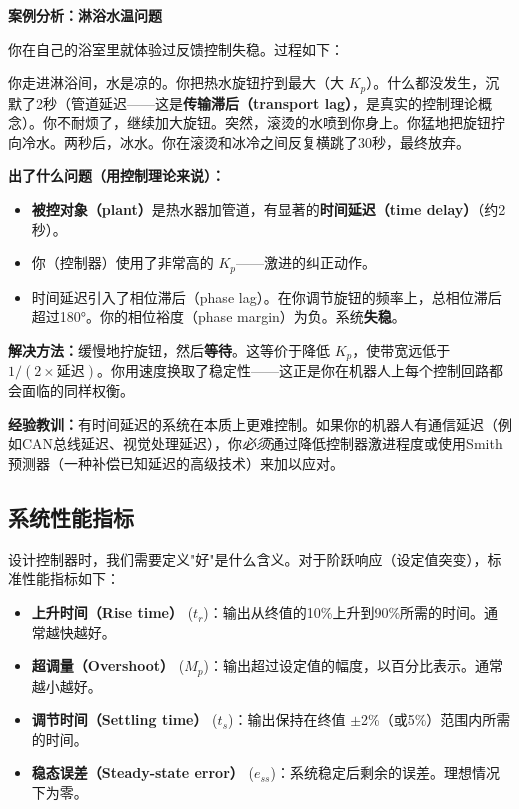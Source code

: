 \vspace{0.5em}
\begin{mdframed}[linewidth=1pt, innertopmargin=10pt, innerbottommargin=10pt]
\textbf{案例分析：淋浴水温问题}

\vspace{0.3em}
你在自己的浴室里就体验过反馈控制失稳。过程如下：

你走进淋浴间，水是凉的。你把热水旋钮拧到最大（大 $K_p$）。什么都没发生，沉默了2秒（管道延迟——这是\textbf{传输滞后（transport lag）}，是真实的控制理论概念）。你不耐烦了，继续加大旋钮。突然，滚烫的水喷到你身上。你猛地把旋钮拧向冷水。两秒后，冰水。你在滚烫和冰冷之间反复横跳了30秒，最终放弃。

\textbf{出了什么问题（用控制理论来说）：}
\begin{itemize}[nosep]
    \item \textbf{被控对象（plant）}是热水器加管道，有显著的\textbf{时间延迟（time delay）}（约2秒）。
    \item 你（控制器）使用了非常高的 $K_p$——激进的纠正动作。
    \item 时间延迟引入了相位滞后（phase lag）。在你调节旋钮的频率上，总相位滞后超过180°。你的相位裕度（phase margin）为负。系统\textbf{失稳}。
\end{itemize}

\textbf{解决方法：}缓慢地拧旋钮，然后\textbf{等待}。这等价于降低 $K_p$，使带宽远低于 $1/(2 \times \text{延迟})$。你用速度换取了稳定性——这正是你在机器人上每个控制回路都会面临的同样权衡。

\textbf{经验教训：}有时间延迟的系统在本质上更难控制。如果你的机器人有通信延迟（例如CAN总线延迟、视觉处理延迟），你\textit{必须}通过降低控制器激进程度或使用Smith预测器（一种补偿已知延迟的高级技术）来加以应对。
\end{mdframed}

\subsection{系统性能指标}

设计控制器时，我们需要定义"好"是什么含义。对于阶跃响应（设定值突变），标准性能指标如下：

\begin{itemize}
    \item \textbf{上升时间（Rise time）} ($t_r$)：输出从终值的10\%上升到90\%所需的时间。通常越快越好。
    \item \textbf{超调量（Overshoot）} ($M_p$)：输出超过设定值的幅度，以百分比表示。通常越小越好。
    \item \textbf{调节时间（Settling time）} ($t_s$)：输出保持在终值 $\pm$2\%（或5\%）范围内所需的时间。
    \item \textbf{稳态误差（Steady-state error）} ($e_{ss}$)：系统稳定后剩余的误差。理想情况下为零。
\end{itemize}

